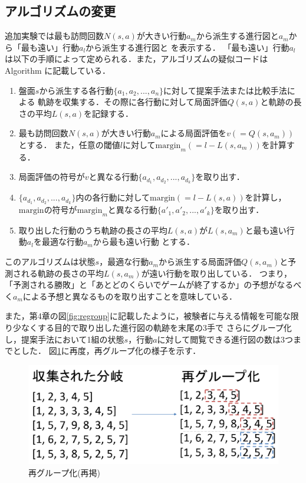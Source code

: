 \subsection{アルゴリズムの変更}
追加実験では最も訪問回数$N(s, a)$が大きい行動$a_m$から派生する進行図と$a_m$から「最も遠い」行動$a_l$から派生する進行図と
を表示する．
「最も遠い」行動$a_l$は以下の手順によって定められる．また，アルゴリズムの疑似コードはAlgorithm\label{alg:myalg-add} に記載している．
\begin{enumerate}
    \item 盤面$s$から派生する各行動$\{a_1, a_2, ..., a_n\}$に対して提案手法または比較手法による
    軌跡を収集する．その際に各行動に対して局面評価$Q(s, a)$と軌跡の長さの平均$L(s, a)$を記録する．
    \item 最も訪問回数$N(s, a)$が大きい行動$a_m$による局面評価を$v(=Q(s, a_m))$とする．
    また，任意の閾値$l$に対して$\textrm{margin}_m(=l-L(s, a_m))$を計算する．
    \item 局面評価の符号が$v$と異なる行動$\{a_{d_1}, a_{d_2}, ..., a_{d_k}\}$を取り出す．
    \item $\{a_{d_1}, a_{d_2}, ..., a_{d_k}\}$内の各行動に対して$\textrm{margin}(=l-L(s, a))$を計算し，
    $\textrm{margin}$の符号が$\textrm{margin}_m$と異なる行動$\{{a'}_{1}, {a'}_{2}, ..., {a'}_{k}\}$を取り出す．
    \item 取り出した行動のうち軌跡の長さの平均$L(s, a)$が$L(s, a_m)$と最も遠い行動$a_l$を最適な行動$a_m$から最も遠い行動
    とする．
\end{enumerate}
このアルゴリズムは状態$s$，最適な行動$a_m$から派生する局面評価$Q(s, a_m)$と予測される軌跡の長さの平均$L(s, a_m)$が遠い行動を取り出している．
つまり，「予測される勝敗」と「あとどのくらいでゲームが終了するか」の予想がなるべく$a_m$による予想と異なるものを取り出すことを意味している．

また，第4章の図\ref{fig:regroup}に記載したように，被験者に与える情報を可能な限り少なくする目的で取り出した進行図の軌跡を末尾の3手で
さらにグループ化し，提案手法において1組の状態$s$，行動$a$に対して閲覧できる進行図の数は3つまでとした．
図\ref{fig:re-regroup}に再度，再グループ化の様子を示す．
\begin{figure}[t]
	\centering
	\includegraphics[width=\linewidth]{./figure/regroup.pdf}
	\caption{再グループ化(再掲)}
	\label{fig:re-regroup}
\end{figure}

